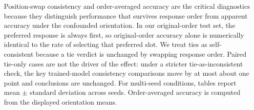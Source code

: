 \documentclass[11pt]{article}
\begin{document}
Position-swap consistency and order-averaged accuracy are the critical diagnostics because they distinguish performance that survives response order from apparent accuracy under the confounded orientation. In our original-order test set, the preferred response is always first, so original-order accuracy alone is numerically identical to the rate of selecting that preferred slot. We treat ties as self-consistent because a tie verdict is unchanged by swapping response order. Paired tie-only cases are not the driver of the effect: under a stricter tie-as-inconsistent check, the key trained-model consistency comparisons move by at most about one point and conclusions are unchanged. For multi-seed conditions, tables report mean $\pm$ standard deviation across seeds. Order-averaged accuracy is computed from the displayed orientation means.
\end{document}
